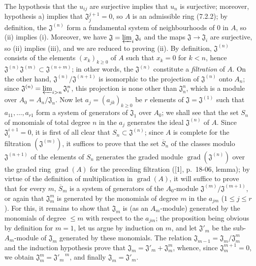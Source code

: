 The hypothesis that the $u_{ij}$ are surjective implies that $u_n$ is surjective;
moreover, hypothesis a) implies that $\mathfrak J_j^{j+1}=0$, so $A$ is
an admissible ring (7.2.2); by definition, the $\mathfrak J^{(n)}$ form
a fundamental system of neighbourhoods of $0$ in $A$, so (ii) implies (i).
Moreover, we have $\mathfrak J=\varprojlim_i\mathfrak J_i$ and the maps
$\mathfrak J\to\mathfrak J_i$ are surjective, so (ii) implies (iii), and
we are reduced to proving (ii). By definition, $\mathfrak J^{(n)}$ consists
of the elements $(x_k)_{k\geq0}$ of $A$ such that $x_k=0$ for $k<n$, hence
$\mathfrak J^{(n)}\mathfrak J^{(m)}\subset\mathfrak J^{(n+m)}$; in other words,
the $\mathfrak J^{(n)}$ constitute a \emph{filtration} of $A$. On the other
hand, $\mathfrak J^{(n)}/\mathfrak J^{(n+1)}$ is isomorphic to the projection of
$\mathfrak J^{(n)}$ onto $A_n$; since
$\mathfrak J^{(n)}=\varprojlim_{i>n}\mathfrak J_i^n$, this projection is none
other than $\mathfrak J_n^n$, which is a module over
$A_0=A_n/\mathfrak J_n$. Now let $a_j=(a_{jk})_{k\geq0}$ be $r$ elements of
$\mathfrak J=\mathfrak J^{(1)}$ such that $a_{11},\ldots,a_{r1}$ form a
system of generators of $\mathfrak J_1$ over $A_0$; we shall see that
the set $S_n$ of monomials of total degree $n$ in the $a_j$ generates the ideal
$\mathfrak J^{(n)}$ of $A$. Since $\mathfrak J_i^{i+1}=0$, it is first of all
clear that $S_n\subset\mathfrak J^{(n)}$; since $A$ is complete for the
filtration $(\mathfrak J^{(m)})$, it suffices to prove that the set
$\overline S_n$ of the classes modulo $\mathfrak J^{(n+1)}$ of the elements of $S_n$
generates the graded module $\operatorname{grad}(\mathfrak J^{(n)})$ over
the graded ring $\operatorname{grad}(A)$ for the preceding filtration
([1], p.~18-06, lemma); by virtue of the definition of multiplication in
$\operatorname{grad}(A)$,
it will suffice to prove that for every $m$, $\overline S_m$ is a system of
generators of the $A_0$-module
$\mathfrak J^{(m)}/\mathfrak J^{(m+1)}$, or again that $\mathfrak J_m^m$ is
generated by the monomials of degree $m$ in the $a_{jm}$ ($1\leq j\leq r$).
For this, it remains to show that $\mathfrak J_m$ is (as an
$A_m$-module) generated by the monomials of degree $\leq m$ with respect to the
$a_{jm}$; the proposition being obvious by definition for $m=1$,
let us argue by induction on $m$, and let $\mathfrak J'_m$ be the sub-$A_m$-module
of $\mathfrak J_m$ generated by these monomials. The relation
$\mathfrak J_{m-1}=\mathfrak J_m/\mathfrak J_m^m$ and the induction hypothesis
prove that $\mathfrak J_m=\mathfrak J'_m+\mathfrak J_m^m$, whence, since
$\mathfrak J_m^{m+1}=0$, we obtain
$\mathfrak J_m^m={\mathfrak J'_m}^{\,m}$, and finally
$\mathfrak J_m=\mathfrak J'_m$.


